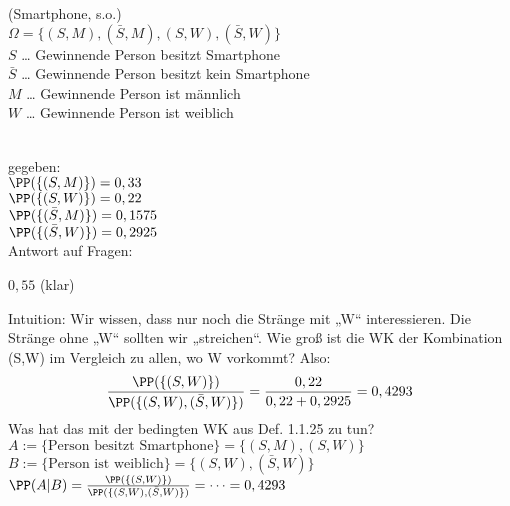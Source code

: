  (Smartphone, s.o.)\\
$\Omega = \{ (S,M), (\bar S, M), (S, W), (\bar S, W)\}$\\
$S$ … Gewinnende Person besitzt Smartphone\\
$\bar S$ … Gewinnende Person besitzt kein Smartphone\\
$M$ … Gewinnende Person ist männlich\\
$W$ … Gewinnende Person ist weiblich\\
\\
gegeben: \\
$\PP(\{(S,M)\})=0,33$\\
$\PP(\{(S,W)\})=0,22$\\
$\PP(\{ (\bar S, M )\})=0,1575$\\
$\PP(\{ (\bar S, W )\})=0,2925$\\
Antwort auf Fragen:
\begin{anumerate}
\item $0,55$ (klar)
\item Intuition: Wir wissen, dass nur noch die Stränge mit „W“ interessieren. Die Stränge ohne „W“ sollten wir „streichen“. Wie groß ist die WK der Kombination (S,W) im Vergleich zu allen, wo W vorkommt? Also:$$\frac{\PP(\{(S,W)\})}{\PP(\{(S,W),(\bar S,W)\})}=\frac{0,22}{0,22+0,2925}=0,4293$$
Was hat das mit der bedingten WK aus Def. 1.1.25 zu tun? \\
$A:=\{\text{Person besitzt Smartphone}\}=\{(S,M),(S,W)\}$\\
$B:=\{\text{Person ist weiblich}\} = \{(S,W), (\bar S ,W)\}$ \\
$\PP(A|B)=\frac{\PP(\{(S,W)\})}{\PP(\{(S,W), (\bar S, W)\})}=\dots =0,4293$
\end{anumerate}

